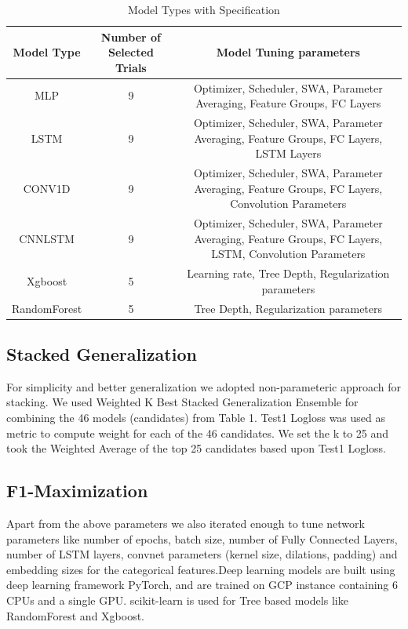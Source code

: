\begin{table}[t]
\caption{Model Types with Specification}
\vspace{0.1 in}
\centering
\resizebox{6.6in}{!}
{%
\begin{tabular}{c|c|c}
\hline
{\bf Model Type} & {\bf Number of Selected Trials} & {\bf Model Tuning parameters} \\  \hline
MLP	  		&  9 & Optimizer, Scheduler, SWA, Parameter Averaging, Feature Groups, FC Layers \\ \hline
LSTM  		& 9 & Optimizer, Scheduler, SWA, Parameter Averaging, Feature Groups, FC Layers, LSTM Layers  \\ \hline
CONV1D			& 9	& Optimizer, Scheduler, SWA, Parameter Averaging, Feature Groups, FC Layers, Convolution Parameters  \\ \hline
CNNLSTM 		& 9	& Optimizer, Scheduler, SWA, Parameter Averaging, Feature Groups, FC Layers, LSTM, Convolution Parameters  \\ \hline
Xgboost 		& 5	& Learning rate, Tree Depth, Regularization parameters  \\ \hline
RandomForest 		& 5	& Tree Depth, Regularization parameters \\ \hline
\end{tabular}
}
\label{tab:accuracy}
\end{table}

\subsection{Stacked Generalization}
For simplicity and better generalization we adopted non-parameteric approach for stacking.
We used Weighted K Best Stacked Generalization Ensemble for combining the 46 models (candidates) from Table 1. 
Test1 Logloss was used as metric to compute weight for each of the 46 candidates. We set the k to 25 and 
took the Weighted Average of the top 25 candidates based upon Test1 Logloss.

\subsection{F1-Maximization}
Apart from the above parameters we also iterated enough to tune network parameters like number of epochs, batch size, 
number of Fully Connected Layers, number of LSTM layers, convnet parameters (kernel size, dilations, padding)
and embedding sizes for the categorical features.Deep learning models are built using deep learning framework
PyTorch, and are trained on GCP instance containing 6 CPUs and a single GPU. scikit-learn is used for Tree
based models like RandomForest and Xgboost.
